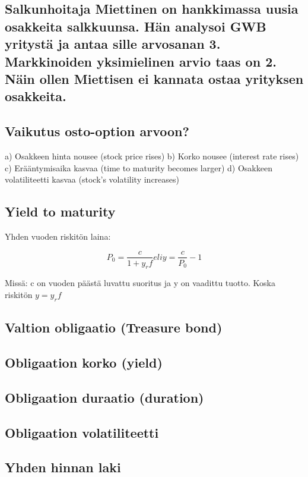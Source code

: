 \documentclass[a4paper]{article}
\begin{document}
\subsection{Salkunhoitaja Miettinen on hankkimassa uusia osakkeita salkkuunsa. Hän analysoi GWB yritystä ja antaa sille arvosanan 3. Markkinoiden yksimielinen arvio taas on 2. Näin ollen Miettisen ei kannata ostaa yrityksen osakkeita.}

\subsection{Vaikutus osto-option arvoon?}
a) Osakkeen hinta nousee (stock price rises)
b) Korko nousee (interest rate rises)
c) Erääntymisaika kasvaa (time to maturity becomes larger)
d) Osakkeen volatiliteetti kasvaa (stock's volatility increases)

\subsection{Yield to maturity}

Yhden vuoden riskitön laina:

\[
P_0 = \frac{c}{1 + y_rf} eli y = \frac{c}{P_0} - 1
\]

Missä: c on vuoden päästä luvattu suoritus ja y on vaadittu tuotto. Koska riskitön $y = y_rf$

\subsection{Valtion obligaatio (Treasure bond)}

\subsection{Obligaation korko (yield)}

\subsection{Obligaation duraatio (duration)}

\subsection{Obligaation volatiliteetti}


\subsection{Yhden hinnan laki}
\end{document}
